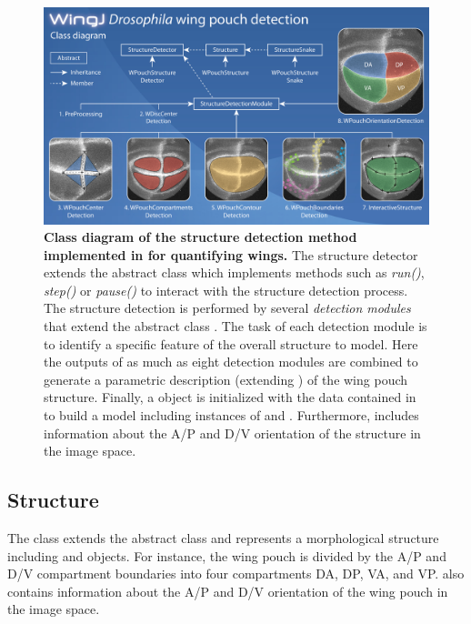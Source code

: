 
\begin{figure}[h]
\centering
\includegraphics[width=146mm]{images/wingj-wpouch-diagram_300dpi.jpg}
\caption{\textbf{Class diagram of the structure detection method implemented in \wingj for quantifying \droso wings.} The structure detector \WPouchStructureDetector extends the abstract class \StructureDetector which implements methods such as \textit{run()}, \textit{step()} or \textit{pause()} to interact with the structure detection process. The structure detection is performed by several \emph{detection modules} that extend the abstract class \StructureDetectionModule. The task of each detection module is to identify a specific feature of the overall structure to model. Here the outputs of as much as eight detection modules are combined to generate a parametric description (extending \WPouchStructureSnake) of the wing pouch structure. Finally, a \WPouchStructure object is initialized with the data contained in \WPouchStructureSnake to build a model including instances of \Compartment and \Boundary. Furthermore, \WPouchStructure includes information about the A/P and D/V orientation of the structure in the image space.}
\label{fig:wpouch_diagram}
\end{figure}


\subsection{Structure}
The class \WPouchStructure extends the abstract class \Structure and represents a morphological structure including \Compartment and \Boundary objects. For instance, the wing pouch is divided by the A/P and D/V compartment boundaries into four compartments DA, DP, VA, and VP. \WPouchStructure also contains information about the A/P and D/V orientation of the wing pouch in the image space.


